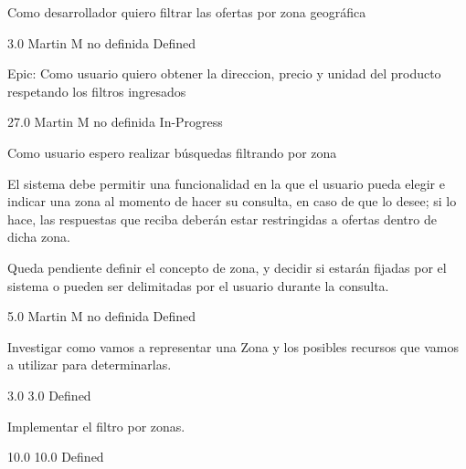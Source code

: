 \vspace{20pt}

	{Como desarrollador quiero filtrar las ofertas por zona geográfica} %
	{

} %
	{} %
	{3.0} %
	{Martin M} %
	{no definida} %
	{Defined} %


\vspace{20pt}

	{Epic: Como usuario quiero obtener la direccion, precio y unidad del producto respetando los filtros ingresados} %
	{

} %
	{} %
	{27.0} %
	{Martin M} %
	{no definida} %
	{In-Progress} %


\vspace{20pt}

	{Como usuario espero realizar búsquedas filtrando por zona} %
	{El sistema debe permitir una funcionalidad en la que el usuario pueda elegir e
indicar una zona al momento de hacer su consulta, en caso de que lo desee; si
lo hace, las respuestas que reciba deberán estar restringidas a ofertas dentro
de dicha zona.

  

Queda pendiente definir el concepto de zona, y decidir si estarán fijadas por
el sistema o pueden ser delimitadas por el usuario durante la consulta.

} %
	{} %
	{5.0} %
	{Martin M} %
	{no definida} %
	{Defined} %

		{Investigar como vamos a representar una Zona y los posibles recursos que vamos a utilizar para determinarlas.} %
		{

} %
		{3.0} %
		{} %
		{3.0} %
		{Defined} %

		{Implementar el filtro por zonas.} %
		{

} %
		{10.0} %
		{} %
		{10.0} %
		{Defined} %


